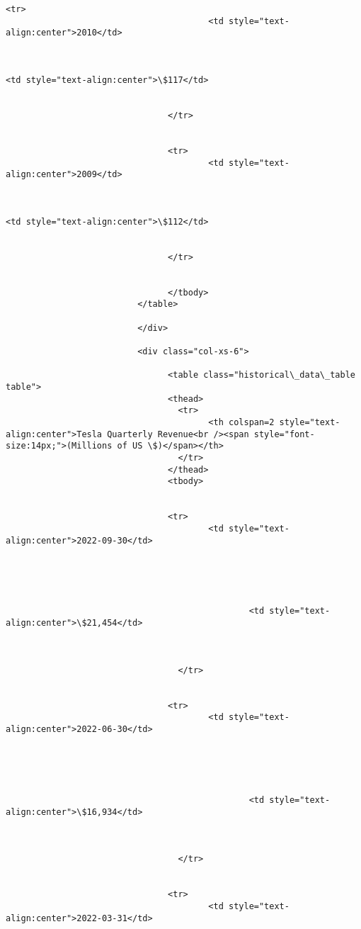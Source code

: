 \documentclass[11pt]{article}
\begin{document}
\begin{Verbatim}[commandchars=\\\{\}]
                                <tr>
                                        <td style="text-align:center">2010</td>



<td style="text-align:center">\$117</td>


                                </tr>


                                <tr>
                                        <td style="text-align:center">2009</td>



<td style="text-align:center">\$112</td>


                                </tr>


                                </tbody>
                          </table>

                          </div>

                          <div class="col-xs-6">

                                <table class="historical\_data\_table table">
                                <thead>
                                  <tr>
                                        <th colspan=2 style="text-
align:center">Tesla Quarterly Revenue<br /><span style="font-
size:14px;">(Millions of US \$)</span></th>
                                  </tr>
                                </thead>
                                <tbody>


                                <tr>
                                        <td style="text-
align:center">2022-09-30</td>





                                                <td style="text-
align:center">\$21,454</td>



                                  </tr>


                                <tr>
                                        <td style="text-
align:center">2022-06-30</td>





                                                <td style="text-
align:center">\$16,934</td>



                                  </tr>


                                <tr>
                                        <td style="text-
align:center">2022-03-31</td>






\end{Verbatim}
\end{document}
